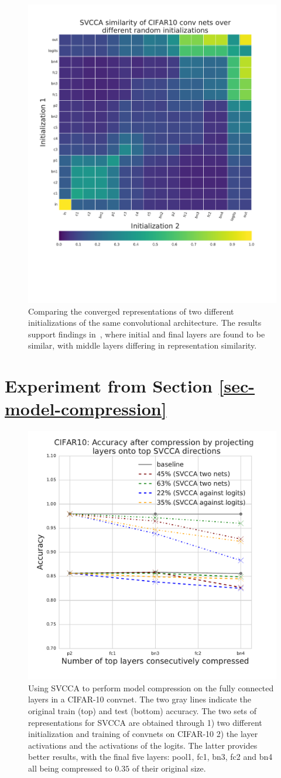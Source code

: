 \documentclass{article} %
\begin{document}
\begin{figure}[ht]
   \centering
   \hspace*{-1.5cm}
   \includegraphics[width=0.5\columnwidth]{figures_nips/Two_conv_nets_mean.pdf}
   \caption{Comparing the converged representations of two different initializations of the same convolutional architecture. The results support findings in~\cite{li2015convergent}, where initial and final layers are found to be similar, with middle layers differing in representation similarity.}
   \label{fig-SVCCA-conv-nets}
   \vspace*{-0.9em}
 \end{figure}

\section{Experiment from Section \ref{sec-model-compression}}

\vspace*{-0.4em}
\begin{figure}
   \centering
   \includegraphics[width=0.5\columnwidth]{figures_nips/CIFAR10_model_compression_plot.pdf}
   \caption{\small Using SVCCA to perform model compression on the fully connected layers in a CIFAR-10 convnet. The two gray lines indicate the original train (top) and test (bottom) accuracy. The two sets of representations for SVCCA are obtained through 1) two different initialization and training of convnets on CIFAR-10 2) the layer activations and the activations of the logits. The latter provides better results, with the final five layers: pool1, fc1, bn3, fc2 and bn4 all being compressed to $0.35$ of their original size. }
   \label{fig-SVCCA-compression}
   \vspace*{-0.9em}
 \end{figure}
 
\end{document}
